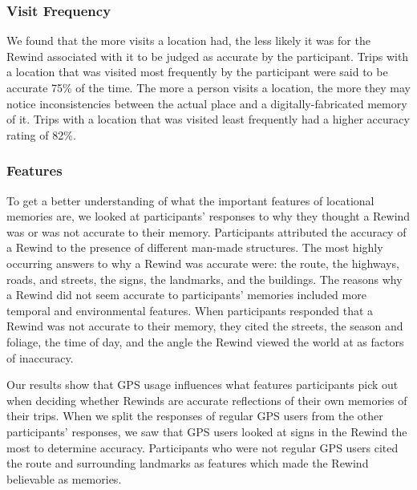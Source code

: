 \documentclass{sigchi}
\begin{document}

\subsubsection{Visit Frequency}
We found that the more visits a location had, the less likely it was for the Rewind associated with it to be judged as accurate by the participant. Trips with a location that was visited most frequently by the participant were said to be accurate 75\% of the time. The more a person visits a location, the more they may notice inconsistencies between the actual place and a digitally-fabricated memory of it. Trips with a location that was visited least frequently had a higher accuracy rating of 82\%.

\subsubsection{Features}
To get a better understanding of what the important features of locational memories are, we looked at participants' responses to why they thought a Rewind was or was not accurate to their memory. Participants attributed the accuracy of a Rewind to the presence of different man-made structures. The most highly occurring answers to why a Rewind was accurate were: the route, the highways, roads, and streets, the signs, the landmarks, and the buildings. The reasons why a Rewind did not seem accurate to participants' memories included more temporal and environmental features. When participants responded that a Rewind was not accurate to their memory, they cited the streets, the season and foliage, the time of day, and the angle the Rewind viewed the world at as factors of inaccuracy.

Our results show that GPS usage influences what features participants pick out when deciding whether Rewinds are accurate reflections of their own memories of their trips. When we split the responses of regular GPS users from the other participants' responses, we saw that GPS users looked at signs in the Rewind the most to determine accuracy. Participants who were not regular GPS users cited the route and surrounding landmarks as features which made the Rewind believable as memories.
\end{document}
